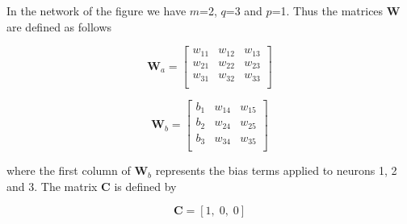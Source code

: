\documentclass[10pt]{article}
\newcommand{\matr}[1]{\boldsymbol{#1}}
\begin{document}
\begin{enumerate}
In the network of the figure we have $m$=2, $q$=3 and $p$=1. Thus the
matrices $\matr{W}$ are defined as follows

\[
\matr{W}_a = 
\left[\begin{array}{ccc}
w_{11} & w_{12} & w_{13} \\
w_{21} & w_{22} & w_{23} \\
w_{31} & w_{32} & w_{33} \\
\end{array}\right]
\]

\[
\matr{W}_b = 
\left[\begin{array}{ccc}
b_{1} & w_{14} & w_{15} \\
b_{2} & w_{24} & w_{25} \\
b_{3} & w_{34} & w_{35} \\
\end{array}\right]
\]

where the first column of $\matr{W}_b$ represents the bias terms applied to
neurons 1, 2 and 3. The matrix $\matr{C}$ is defined by

\[
\matr{C} = [1, \; 0, \; 0]
\]


\end{enumerate}
\end{document}
